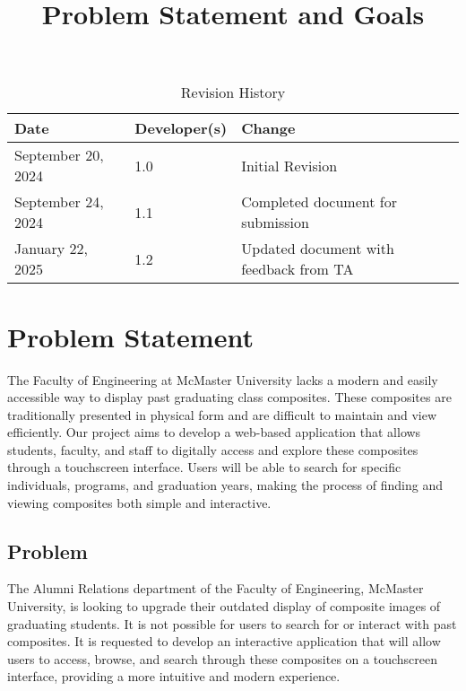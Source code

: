 \documentclass{article}
\title{Problem Statement and Goals\\\progname}
\author{\authname}
\date{}
\begin{document}
\maketitle
\begin{table}[hp]
\caption{Revision History} \label{TblRevisionHistory}
\begin{tabularx}{\textwidth}{llX}
\toprule
\textbf{Date} & \textbf{Developer(s)} & \textbf{Change}\\
\midrule
September 20, 2024 & 1.0 & Initial Revision\\
September 24, 2024 & 1.1 & Completed document for submission\\
January 22, 2025 & 1.2 & Updated document with feedback from TA\\
\bottomrule
\end{tabularx}
\end{table}
\section{Problem Statement}


The Faculty of Engineering at McMaster University lacks a modern and easily accessible way to display past graduating class composites. These composites are traditionally presented in physical form and are difficult to maintain and view efficiently. Our project aims to develop a web-based application that allows students, faculty, and staff to digitally access and explore these composites through a touchscreen interface. Users will be able to search for specific individuals, programs, and graduation years, making the process of finding and viewing composites both simple and interactive.


\subsection{Problem}
The Alumni Relations department of the Faculty of Engineering, McMaster University, is looking to upgrade their outdated display of composite images of graduating students. It is not possible for users to search for or interact with past composites. It is requested to develop an interactive application that will allow users to access, browse, and search through these composites on a touchscreen interface, providing a more intuitive and modern experience.
\end{document}
